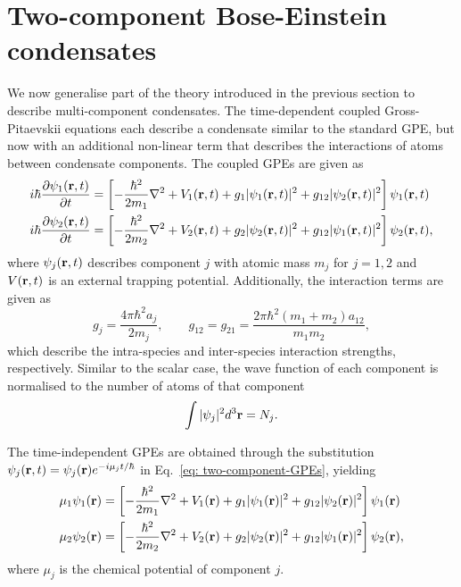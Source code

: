 \section{Two-component Bose-Einstein condensates}
We now generalise part of the theory introduced in the previous section to
describe multi-component condensates.
The time-dependent coupled Gross-Pitaevskii equations each describe a condensate
similar to the standard GPE, but now with an additional non-linear term that
describes the interactions of atoms between condensate components.
The coupled GPEs are given as
\begin{equation}\label{eq: two-component-GPEs}
    \begin{aligned}
        i\hbar \pdv{\psi_1(\vb{r}, t)}{t} & =
        \left[-\frac{\hbar^2}{2m_1}\nabla^2 + V_1(\vb{r}, t)
            + g_1|\psi_1(\vb{r}, t)|^2
        + g_{12}|\psi_2(\vb{r}, t)|^2\right]\psi_1(\vb{r}, t) \\
        i\hbar \pdv{\psi_2(\vb{r}, t)}{t} & =
        \left[-\frac{\hbar^2}{2m_2}\nabla^2 + V_2(\vb{r}, t)
            + g_2|\psi_2(\vb{r}, t)|^2
            + g_{12}|\psi_1(\vb{r}, t)|^2\right]\psi_2(\vb{r}, t),
    \end{aligned}
\end{equation}
where \(\psi_j(\vb{r}, t)\) describes component \(j\) with atomic mass \(m_j\)
for \(j=1, 2\) and \(V(\vb{r}, t)\) is an external trapping potential.
Additionally, the interaction terms are given as
\begin{equation}
    g_j = \frac{4\pi \hbar^2a_j}{2m_j}, \qquad
    g_{12} = g_{21} = \frac{2\pi\hbar^2(m_1+m_2)a_{12}}{m_1m_2},
\end{equation}
which describe the intra-species and inter-species interaction strengths,
respectively.
Similar to the scalar case, the wave function of each component is normalised
to the number of atoms of that component
\begin{equation}
    \int |\psi_j|^2 d^3\vb{r} = N_j.
\end{equation}

The time-independent GPEs are obtained through the substitution
\(\psi_j(\vb{r}, t)=\psi_j(\vb{r})e^{-i\mu_j t/\hbar}\) in
Eq.~\eqref{eq: two-component-GPEs}, yielding
\begin{equation}\label{eq: time-indep-two-component-GPEs}
    \begin{aligned}
        \mu_1\psi_1(\vb{r}) & =
        \left[-\frac{\hbar^2}{2m_1}\nabla^2 + V_1(\vb{r})
            + g_1|\psi_1(\vb{r})|^2
        + g_{12}|\psi_2(\vb{r})|^2\right]\psi_1(\vb{r}) \\
        \mu_2\psi_2(\vb{r}) & =
        \left[-\frac{\hbar^2}{2m_2}\nabla^2 + V_2(\vb{r})
            + g_2|\psi_2(\vb{r})|^2
            + g_{12}|\psi_1(\vb{r})|^2\right]\psi_2(\vb{r}),
    \end{aligned}
\end{equation}
where \(\mu_j\) is the chemical potential of component \(j\).

